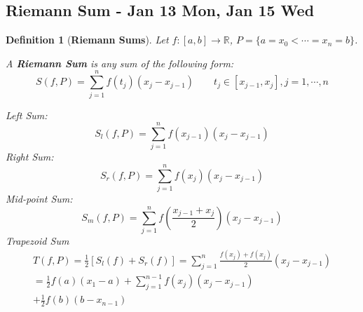 \documentclass[12pt]{article}
\theoremstyle{plain}
\newtheorem{definition}{Definition}[subsection]
\begin{document}
	\newpage
	\subsection{Riemann Sum - Jan 13 Mon, Jan 15 Wed}
	\begin{definition}[\textbf{Riemann Sums}]
		Let $f:[a,b]\to \mathbb{R}$, $P=\{a=x_0<\cdots=x_n=b\}$.

		A \textbf{Riemann Sum} is any sum of the following form: 
		\[
			S(f,P) = \sum_{j=1}^n f(t_j)(x_j-x_{j-1}) \qquad 
			t_j\in[x_{j-1},x_j], j = 1,\cdots, n
		\]
		
		Left Sum: 
		\[
			S_l(f,P) = \sum_{j=1}^n f(x_{j-1}) (x_j-x_{j-1})
		\]
		Right Sum: 
		\[
			S_r(f,P) = \sum_{j=1}^n f(x_{j}) (x_j-x_{j-1})
		\]
		Mid-point Sum: 
		\[
			S_m(f,P) =\sum_{j=1}^n f(\frac{x_{j-1}+x_j}2) (x_j-x_{j-1})
		\]
		Trapezoid Sum
		\begin{align*}
			T(f,P) = \frac 12 [S_l(f)+S_r(f)]
			= \sum_{j=1}^n \frac{f(x_j)+f(x_j)}2 (x_j-x_{j-1})\\
			= \frac 12 f(a)(x_1-a) +\sum_{j=1}^{n-1} f(x_j)(x_j-x_{j-1})\\
			+\frac 12 f(b) (b-x_{n-1})
		\end{align*}
	\end{definition}
\end{document}

